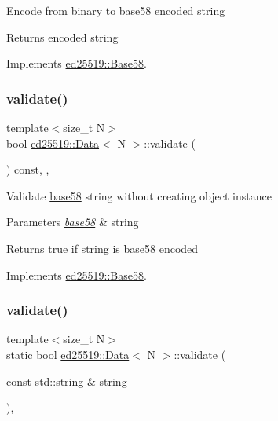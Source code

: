 Encode from binary to \mbox{\hyperlink{namespaceed25519_1_1base58}{base58}} encoded string \begin{DoxyReturn}{Returns}
encoded string 
\end{DoxyReturn}


Implements \mbox{\hyperlink{classed25519_1_1_base58_a1b52a018a5215e2dcf2aa388b0fe06bf}{ed25519\+::\+Base58}}.

\mbox{\label{classed25519_1_1_data_ac365c9862b45379c677449b622c74da5}} 
\subsubsection{\texorpdfstring{validate()}{validate()}\hspace{0.1cm}{\footnotesize\ttfamily [1/2]}}
{\footnotesize\ttfamily template$<$size\+\_\+t N$>$ \\
bool \mbox{\hyperlink{classed25519_1_1_data}{ed25519\+::\+Data}}$<$ N $>$\+::validate (\begin{DoxyParamCaption}{ }\end{DoxyParamCaption}) const\hspace{0.3cm}{\ttfamily [inline]}, {\ttfamily [override]}, {\ttfamily [virtual]}}

Validate \mbox{\hyperlink{namespaceed25519_1_1base58}{base58}} string without creating object instance 
\begin{DoxyParams}{Parameters}
{\em \mbox{\hyperlink{namespaceed25519_1_1base58}{base58}}} & string \\
\hline
\end{DoxyParams}
\begin{DoxyReturn}{Returns}
true if string is \mbox{\hyperlink{namespaceed25519_1_1base58}{base58}} encoded 
\end{DoxyReturn}


Implements \mbox{\hyperlink{classed25519_1_1_base58_addfdb1d6d0f7e7f0cd0cf5dd2ee193bb}{ed25519\+::\+Base58}}.

\mbox{\label{classed25519_1_1_data_ade9c93cb08f9d60aa45e75821ed1bcbe}} 
\subsubsection{\texorpdfstring{validate()}{validate()}\hspace{0.1cm}{\footnotesize\ttfamily [2/2]}}
{\footnotesize\ttfamily template$<$size\+\_\+t N$>$ \\
static bool \mbox{\hyperlink{classed25519_1_1_data}{ed25519\+::\+Data}}$<$ N $>$\+::validate (\begin{DoxyParamCaption}\item[{const std\+::string \&}]{string }\end{DoxyParamCaption})\hspace{0.3cm}{\ttfamily [inline]}, {\ttfamily [static]}}

